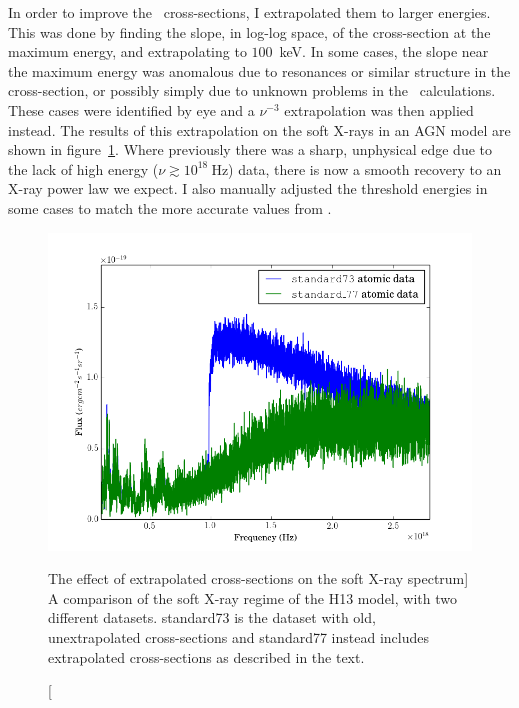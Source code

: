 In order to improve the \top\ cross-sections, I extrapolated them to larger
energies. This was done by finding the slope, in log-log space,
of the cross-section at the maximum energy, and extrapolating to $100$~keV.
In some cases, the slope near the maximum energy was anomalous 
due to resonances or similar structure in the cross-section, or possibly
simply due to unknown problems in the \top\ calculations. These
cases were identified by eye and a $\nu^{-3}$ extrapolation
was then applied instead. 
The results of this extrapolation on the soft X-rays in an AGN model
are shown in figure~\ref{fig:xs}. Where previously there was a sharp,
unphysical edge due to the lack of high energy 
($\nu \gtrsim 10^{18}~\mathrm{Hz}$) data, 
there is now a smooth recovery to an X-ray 
power law we expect. I also manually adjusted the threshold energies in some
cases to match the more accurate values from \cite{vfky}.

\begin{figure}
\centering
\includegraphics[width=1.0\textwidth]{figures/03-radtrans/xs.png}
\caption
[The effect of extrapolated cross-sections on the soft X-ray spectrum]
{
A comparison of the soft X-ray regime of the H13 model, with two different
datasets. standard73 is the dataset with old, unextrapolated cross-sections 
and standard77 instead includes extrapolated cross-sections as described in
the text.
}
\label{fig:xs}
\end{figure}


